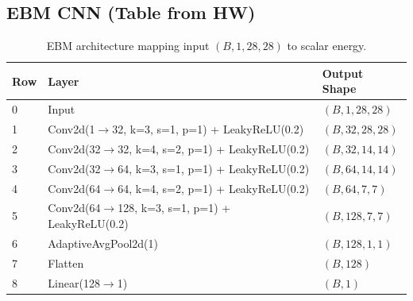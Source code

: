 \documentclass[conference]{IEEEtran}
\begin{document}
\subsection{EBM CNN (Table from HW)}
\begin{table}[H]
\centering
\caption{EBM architecture mapping input $(B,1,28,28)$ to scalar energy.}
\begin{tabular}{lll}
\toprule
Row & Layer & Output Shape \\
\midrule
0 & Input & $(B,1,28,28)$ \\
1 & Conv2d(1$\rightarrow$32, k=3, s=1, p=1) + LeakyReLU(0.2) & $(B,32,28,28)$ \\
2 & Conv2d(32$\rightarrow$32, k=4, s=2, p=1) + LeakyReLU(0.2) & $(B,32,14,14)$ \\
3 & Conv2d(32$\rightarrow$64, k=3, s=1, p=1) + LeakyReLU(0.2) & $(B,64,14,14)$ \\
4 & Conv2d(64$\rightarrow$64, k=4, s=2, p=1) + LeakyReLU(0.2) & $(B,64,7,7)$ \\
5 & Conv2d(64$\rightarrow$128, k=3, s=1, p=1) + LeakyReLU(0.2) & $(B,128,7,7)$ \\
6 & AdaptiveAvgPool2d(1) & $(B,128,1,1)$ \\
7 & Flatten & $(B,128)$ \\
8 & Linear(128$\rightarrow$1) & $(B,1)$ \\
\bottomrule
\end{tabular}
\end{table}
\end{document}
